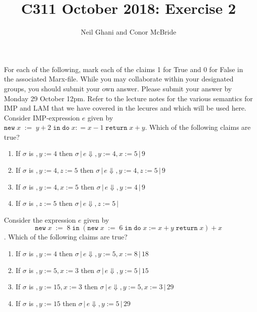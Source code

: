 \documentclass{article}
\begin{document}
\title{C311 October 2018: Exercise 2}
\author{Neil Ghani and Conor McBride}
\maketitle

\newcommand{\newe}[3]{\mathtt{new}\;#1\;\mathtt{:=}\;#2\;\mathtt{in}\;#3}
\newcommand{\newc}[3]{\mathtt{new}\;#1\;\mathtt{:=}\;#2\;\mathtt{in}\;#3}
\newcommand{\doe}[2]{\mathtt{do}\;#1\;\mathtt{return}\;#2}
\newcommand{\doret}[2]{\mathtt{do}\;#1\;\mathtt{return}\;#2}
\newcommand{\ifel}[3]{\mathtt{if}\;\mathtt{(}#1\mathtt{)}\;#2\;\mathtt{else}\;#3}
\newcommand{\whi}[2]{\mathtt{while}\; \mathtt{(}#1\mathtt{)} \;#2}
\newcommand{\ang}[1]{\langle #1 \rangle}
\newcommand{\NT}[1]{\ang{\mathit{#1}}}
\newcommand{\wk}[2]{#1 \backslash #2}
\newcommand{\evalJ}[4]{#1 \,|\, #2 \Downarrow #3 \,|\, #4}

For each of the following, mark each of the claims 1 for True
and 0 for False in the associated Marx-file. While you may collaborate
within your designated groups, you should submit your own answer. Please submit your answer
by Monday 29 October 12pm. Refer to the lecture notes for the various
semantics for IMP and LAM that we have covered in the lecures and
which will be used here.\\[1ex]


 Consider IMP-expression $e$ given by $\newe{x}{y + 2}{\doe{x : = x-1}{x + y}}$.
Which of the following claims are true?
\begin{enumerate}
\item If $\sigma$ is $,y := 4$ then $\evalJ{\sigma}{e}{ ,y:= 4, x:=5}{9}$
\item If $\sigma$ is $,y:= 4, z:=5$ then $\evalJ{\sigma}{e}{ ,y:= 4, z:=5}{9}$
\item If $\sigma$ is $,y:= 4, x:=5$ then $\evalJ{\sigma}{e}{ ,y:= 4}{9}$
\item If $\sigma$ is $,z:=5$ then $\evalJ{\sigma}{e}{ ,z:=5}{}$
\end{enumerate}


 Consider the expression $e$ given by
$$\newe{x}{8}{(\newe{x}{6}{\doe{x := x + y}{x}}) + x}$$. Which of the 
following claims are true?
\begin{enumerate}
\item If $\sigma$ is $,y := 4$ then $\evalJ{\sigma}{e}{,y:=5, x:=8}{18}$
\item If $\sigma$  is $,y := 5, x:=3$ then $\evalJ{\sigma}{e}{,y:=5}{15}$
\item If $\sigma$ is $,y := 15, x:=3$ then $\evalJ{\sigma}{e}{,y:=5,x:=3}{29}$
\item If $\sigma$ is $,y := 15$ then $\evalJ{\sigma}{e}{,y:=5}{29}$
\end{enumerate}
\end{document}

